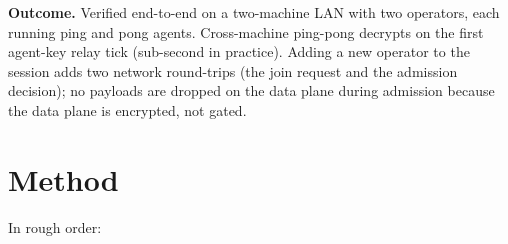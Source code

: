 \documentclass[11pt,a4paper]{article}
\begin{document}
\textbf{Outcome.} Verified end-to-end on a two-machine LAN with
two operators, each running ping and pong agents. Cross-machine
ping-pong decrypts on the first agent-key relay tick (sub-second
in practice). Adding a new operator to the session adds two
network round-trips (the join request and the admission
decision); no payloads are dropped on the data plane during
admission because the data plane is encrypted, not gated.

\section{Method}

In rough order:
\end{document}
